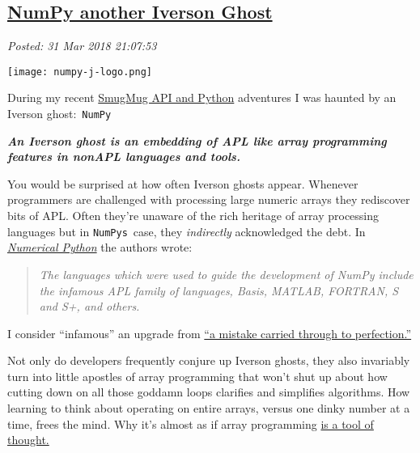 %


\subsection*{\href{https://analyzethedatanotthedrivel.org/2018/03/31/numpy-another-iverson-ghost/}{NumPy another Iverson Ghost}}


\noindent\emph{Posted: 31 Mar 2018 21:07:53}
\vspace{6pt}

\captionsetup[floatingfigure]{labelformat=empty}
\begin{floatingfigure}[l]{0.23\textwidth}
\centering
\texttt{[image: numpy-j-logo.png]}
\label{fig:5565x0}
\end{floatingfigure}During
my recent \href{https://github.com/bakerjd99/smugpyter}{SmugMug API and
Python} adventures I was haunted by an Iverson ghost:~\texttt{NumPy}

\medskip

\emph{\textbf{An Iverson ghost is an embedding of APL like array
programming features in nonAPL languages and tools.}}

\medskip

You would be surprised at how often Iverson ghosts appear. Whenever
programmers are challenged with processing large numeric arrays they
rediscover bits of APL. Often they're unaware of the rich heritage of
array processing languages but in
\texttt{NumPy\textquotesingle{}s}~case, they \emph{indirectly}
acknowledged the debt. In
\href{http://numpy.sourceforge.net/numdoc/numdoc.pdf}{\emph{Numerical
Python}} the authors wrote:


\begin{quote}
\emph{The languages which were used to guide the development of NumPy
include the infamous APL family of languages, Basis, MATLAB, FORTRAN, S
and S+, and others.}
\end{quote}


I consider ``infamous'' an upgrade from
\href{http://www.cs.virginia.edu/~evans/cs655/readings/ewd498.html}{``a
mistake carried through to perfection.''}

Not only do developers frequently conjure up Iverson ghosts, they also
invariably turn into little apostles of array programming that won't
shut up about how cutting down on all those goddamn loops clarifies and
simplifies algorithms. How learning to think about operating on entire
arrays, versus one dinky number at a time, frees the mind. Why it's
almost as if array programming
\href{http://www.jsoftware.com/papers/tot.htm}{is a tool of thought.}

